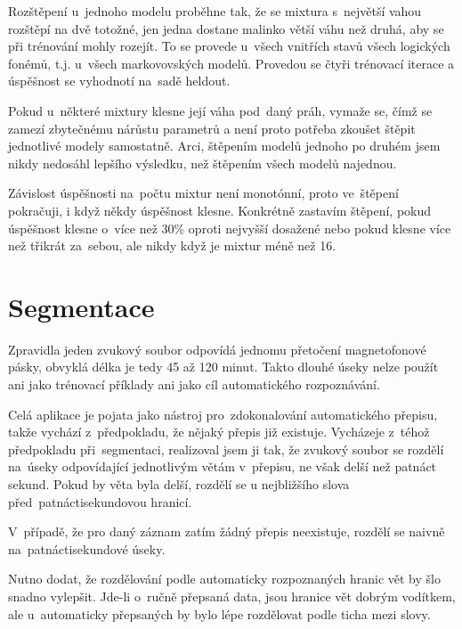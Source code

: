 \begin{enumerate}
Rozštěpení u~jednoho modelu proběhne tak, že se mixtura s~největší vahou
rozštěpí na dvě totožné, jen jedna dostane malinko větší váhu než druhá, aby se
při trénování mohly rozejít. To se provede u~všech vnitřích stavů všech
logických fonémů, t.j. u~všech markovovských modelů. Provedou se čtyři trénovací
iterace a úspěšnost se vyhodnotí na~sadě heldout.

Pokud u~některé mixtury klesne její váha pod~daný práh, vymaže se, čímž se
zamezí zbytečnému nárůstu parametrů a není proto potřeba zkoušet štěpit
jednotlivé modely samostatně. Arci, štěpením modelů jednoho po druhém jsem nikdy nedosáhl lepšího
výsledku, než štěpením všech modelů najednou.

Závislost úspěšnosti na~počtu mixtur není monotónní, proto ve~štěpení pokračuji,
i když někdy úspěšnost klesne. Konkrétně zastavím štěpení, pokud úspěšnost
klesne o~více než 30\% oproti nejvyšší dosažené nebo pokud klesne více než
třikrát za~sebou, ale nikdy když je mixtur méně než 16.


\end{enumerate}

\section{Segmentace}

Zpravidla jeden zvukový soubor odpovídá jednomu přetočení magnetofonové pásky,
obvyklá délka je tedy 45 až 120 minut. Takto dlouhé úseky nelze použít ani jako
trénovací příklady ani jako cíl automatického rozpoznávání.

Celá aplikace je pojata jako nástroj pro~zdokonalování automatického přepisu,
takže vychází z~předpokladu, že nějaký přepis již existuje. Vycházeje z~téhož
předpokladu při~segmentaci, realizoval jsem ji tak, že zvukový soubor se rozdělí
na~úseky odpovídající jednotlivým větám v~přepisu, ne však delší než patnáct
sekund. Pokud by věta byla delší, rozdělí se u nejbližšího slova
před~patnáctisekundovou hranicí.

V~případě, že pro daný záznam zatím žádný přepis neexistuje, rozdělí se naivně
na~patnáctisekundové úseky.

Nutno dodat, že rozdělování podle automaticky rozpoznaných hranic vět by šlo
snadno vylepšit. Jde-li o~ručně přepsaná data, jsou hranice vět dobrým vodítkem,
ale u~automaticky přepsaných by bylo lépe rozdělovat podle ticha mezi slovy.

